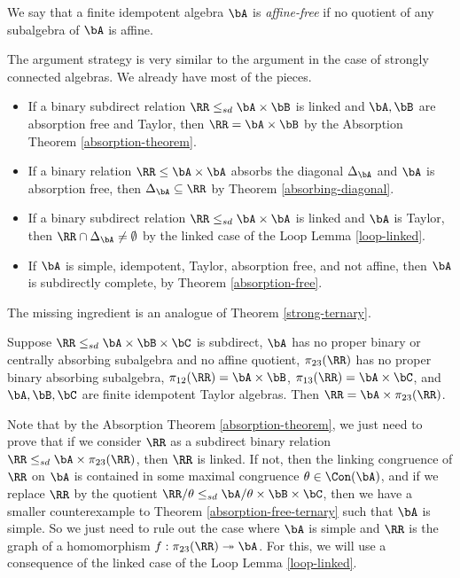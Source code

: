 \begin{defn} We say that a finite idempotent algebra $\bA$ is \emph{affine-free} if no quotient of any subalgebra of $\bA$ is affine.
\end{defn}

The argument strategy is very similar to the argument in the case of strongly connected algebras. We already have most of the pieces.
\begin{itemize}
\item If a binary subdirect relation $\RR \le_{sd} \bA \times \bB$ is linked and $\bA,\bB$ are absorption free and Taylor, then $\RR = \bA\times \bB$ by the Absorption Theorem \ref{absorption-theorem}.

\item If a binary relation $\RR \le \bA \times \bA$ absorbs the diagonal $\Delta_\bA$ and $\bA$ is absorption free, then $\Delta_\bA \subseteq \RR$ by Theorem \ref{absorbing-diagonal}.

\item If a binary subdirect relation $\RR \le_{sd} \bA \times \bA$ is linked and $\bA$ is Taylor, then $\RR \cap \Delta_\bA \ne \emptyset$ by the linked case of the Loop Lemma \ref{loop-linked}.

\item If $\bA$ is simple, idempotent, Taylor, absorption free, and not affine, then $\bA$ is subdirectly complete, by Theorem \ref{absorption-free}.
\end{itemize}
The missing ingredient is an analogue of Theorem \ref{strong-ternary}.

\begin{thm}\label{absorption-free-ternary} Suppose $\RR \le_{sd} \bA \times \bB \times \bC$ is subdirect, $\bA$ has no proper binary or centrally absorbing subalgebra and no affine quotient, $\pi_{23}(\RR)$ has no proper binary absorbing subalgebra, $\pi_{12}(\RR) = \bA \times \bB$, $\pi_{13}(\RR) = \bA\times \bC$, and $\bA,\bB,\bC$ are finite idempotent Taylor algebras. Then $\RR = \bA \times \pi_{23}(\RR)$.
\end{thm}

Note that by the Absorption Theorem \ref{absorption-theorem}, we just need to prove that if we consider $\RR$ as a subdirect binary relation $\RR \le_{sd} \bA \times \pi_{23}(\RR)$, then $\RR$ is linked. If not, then the linking congruence of $\RR$ on $\bA$ is contained in some maximal congruence $\theta \in \Con(\bA)$, and if we replace $\RR$ by the quotient $\RR/\theta \le_{sd} \bA/\theta \times \bB \times \bC$, then we have a smaller counterexample to Theorem \ref{absorption-free-ternary} such that $\bA$ is simple. So we just need to rule out the case where $\bA$ is simple and $\RR$ is the graph of a homomorphism $f : \pi_{23}(\RR) \twoheadrightarrow \bA$. For this, we will use a consequence of the linked case of the Loop Lemma \ref{loop-linked}.

